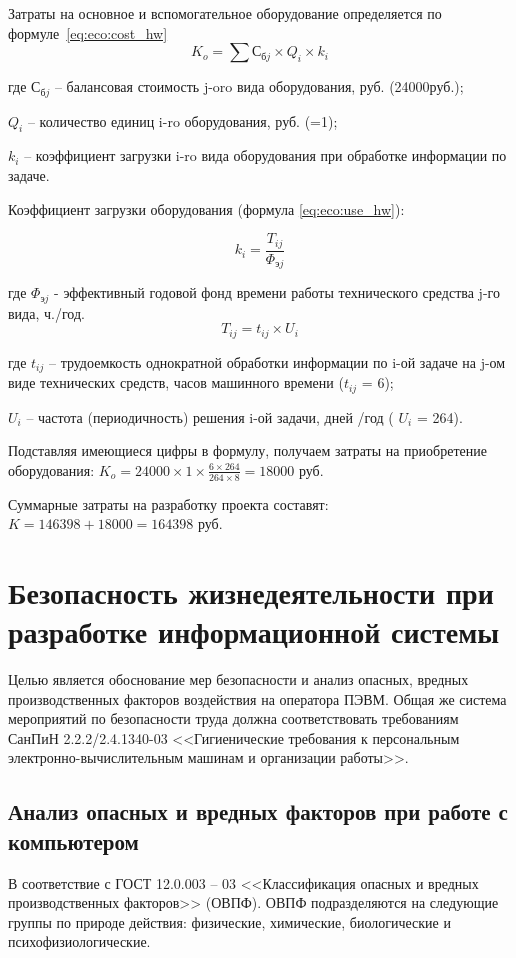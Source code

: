 \documentclass[utf8,usehyperref,12pt]{G7-32}
\begin{document}
Затраты на основное и вспомогательное оборудование определяется по формуле~\ref{eq:eco:cost_hw}
\begin{equation}
  \label{eq:eco:cost_hw}
  K_o = \sum С_{бj} \times Q_i \times k_i
\end{equation}

где $С_{бj}$ – балансовая стоимость j-oro вида оборудования, руб. (24000руб.);

$Q_i$ – количество единиц i-ro оборудования, руб. (=1);

$k_i$ – коэффициент загрузки i-ro вида оборудования при обработке информации по задаче.

Коэффициент загрузки оборудования (формула \ref{eq:eco:use_hw}):

\begin{equation}
  \label{eq:eco:use_hw}
  k_i = \frac{T_{ij}}{\Phi_{эj}}
\end{equation}

где $\Phi_{эj}$ - эффективный годовой фонд времени работы технического средства j-го вида, ч./год.
\begin{equation}
  \label{eq:eco:use_hw_t}
  T_{ij} = t_{ij} \times U_i
\end{equation}

где $t_{ij}$ – трудоемкость однократной обработки информации по i-ой задаче на j-ом виде технических средств, часов машинного времени ($t_{ij}$ = 6);

$U_i$ – частота (периодичность) решения i-ой задачи, дней /год ( $U_i$ = 264).

Подставляя имеющиеся цифры в формулу, получаем затраты на приобретение оборудования:
$K_o = 24000 \times 1 \times \frac{6 \times 264}{264 \times 8} = 18000$ руб.

Суммарные затраты на разработку проекта составят:
$K = 146398 + 18000 = 164398$ руб.

\chapter{Безопасность жизнедеятельности при разработке информационной системы}
Целью является обоснование мер безопасности и анализ опасных, вредных производственных факторов воздействия на оператора ПЭВМ.
Общая же система мероприятий по безопасности труда должна соответствовать требованиям СанПиН 2.2.2/2.4.1340-03 <<Гигиенические требования к персональным электронно-вычислительным машинам и организации работы>>. 

\section{Анализ опасных и вредных факторов при работе с компьютером}
\label{safety_analysis}
В соответствие с ГОСТ 12.0.003 – 03 <<Классификация опасных и вредных производственных факторов>> (ОВПФ)\cite{gost_12.0.003-03}. ОВПФ подразделяются на следующие группы по природе действия: физические, химические, биологические и психофизиологические.
\end{document}
